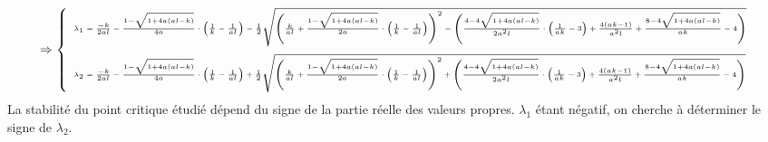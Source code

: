 \documentclass{article}
\begin{document}
\begin{equation*}
\Rightarrow 
\tiny
\left \{
    \begin{array}{l}
        \lambda_{1} =   \frac{-k}{2al} - \frac{1 - \sqrt{1 + 4a(al -k)}}{4a} \cdot \left( \frac{1}{k} - \frac{1}{al} \right) -  \frac{1}{2} \sqrt{ \left(  \frac{k}{al} + \frac{1 - \sqrt{1 + 4a(al -k)}}{2a} \cdot \left( \frac{1}{k} - \frac{1}{al} \right) \right)  ^{2} - \left(    \frac{4 - 4\sqrt{1 + 4a(al -k)}}{2a^2 l} \cdot \left( \frac{1}{ak} - 3 \right) + \frac{4(ak - 1)}{a^2 l} + \frac{8 - 4\sqrt{1 + 4a(al -k)}}{ak} - 4    \right)    }\\\\
        
        \lambda_{2} =  \frac{-k}{2al} - \frac{1 - \sqrt{1 + 4a(al -k)}}{4a} \cdot \left( \frac{1}{k} - \frac{1}{al} \right) + \frac{1}{2} \sqrt{ \left(  \frac{k}{al} + \frac{1 - \sqrt{1 + 4a(al -k)}}{2a} \cdot \left( \frac{1}{k} - \frac{1}{al} \right) \right)  ^{2} + \left(    \frac{4 - 4\sqrt{1 + 4a(al -k)}}{2a^2 l} \cdot \left( \frac{1}{ak} - 3 \right) + \frac{4(ak - 1)}{a^2 l} + \frac{8 - 4\sqrt{1 + 4a(al -k)}}{ak} - 4    \right)    } \\
    \end{array}
\right.
\end{equation*} 
La stabilité du point critique étudié dépend du signe de la partie réelle des valeurs propres. $\lambda_1$ étant négatif, on cherche à déterminer le signe de $\lambda_2$.
\end{document}
